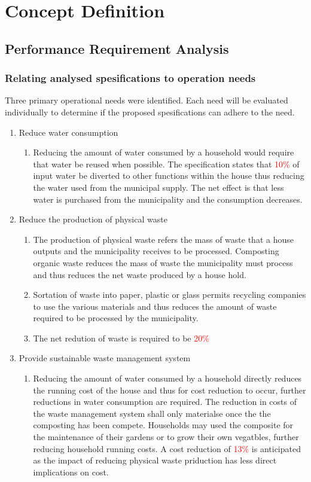 \documentclass[a4paper,11pt,fleqn]{report}
\begin{document}
\section{Concept Definition}
\subsection{Performance Requirement Analysis}
\subsubsection{Relating analysed spesifications to operation needs}
Three primary operational needs were identified. Each need will be evaluated individually to determine if the proposed spesifications can adhere to the need.

\begin{enumerate}
    \item Reduce water consumption
    \begin{enumerate}
        \item Reducing the amount of water consumed by a household would require that water be reused when possible. The specification states that \textcolor{red}{10\%} of input water be diverted to other functions within the house thus reducing the water used from the municipal supply. The net effect is that less water is purchased from the municipality and the consumption decreases.
    \end{enumerate}
    \item Reduce the production of physical waste
    \begin{enumerate}
        \item The production of physical waste refers the mass of waste that a house outputs and the municipality receives to be processed. Composting organic waste reduces the mass of waste the municipality must process and thus reduces the net waste produced by a house hold.
        \item Sortation of waste into paper, plastic or glass permits recycling companies to use the various materials and thus reduces the amount of waste required to be processed by the municipality. 
        \item The net redution of waste is required to be \textcolor{red}{20\%}
    \end{enumerate}
    \item Provide sustainable waste management system
    \begin{enumerate}
        \item Reducing the amount of water consumed by a household directly reduces the running cost of the house and thus for cost reduction to occur, further reductions in water consumption are required. The reduction in costs of the waste management system shall only materialse once the the composting has been compete. Households may used the composite for the maintenance of their gardens or to grow their own vegatbles, further reducing household running costs. A cost reduction of \textcolor{red}{13\%} is anticipated as the impact of reducing physical waste priduction has less direct implications on cost.

\end{enumerate}
\end{enumerate}
\end{document}

